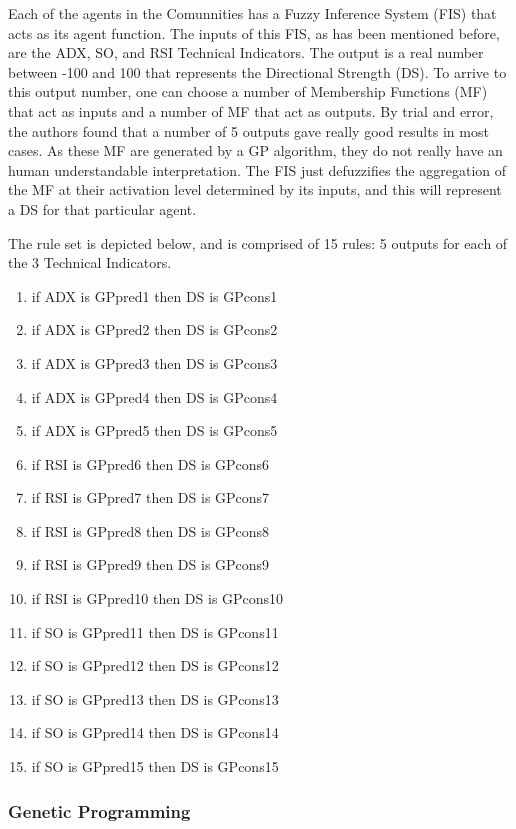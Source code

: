 Each of the agents in the Comunnities has a Fuzzy Inference System (FIS) that acts as its agent function. The inputs of this FIS, as has been mentioned before, are the ADX, SO, and RSI Technical Indicators. The output is a real number between -100 and 100 that represents the Directional Strength (DS). To arrive to this output number, one can choose a number of Membership Functions (MF) that act as inputs and a number of MF that act as outputs. By trial and error, the authors found that a number of 5 outputs gave really good results in most cases. As these MF are generated by a GP algorithm, they do not really have an human understandable interpretation. The FIS just defuzzifies the aggregation of the MF at their activation level determined by its inputs, and this will represent a DS for that particular agent.

The rule set is depicted below, and is comprised of 15 rules: 5 outputs for each of the 3 Technical Indicators.

\begin{enumerate}
\item if ADX is GPpred1 then DS is GPcons1
\item if ADX is GPpred2 then DS is GPcons2
\item if ADX is GPpred3 then DS is GPcons3
\item if ADX is GPpred4 then DS is GPcons4
\item if ADX is GPpred5 then DS is GPcons5

\item if RSI is GPpred6 then DS is GPcons6
\item if RSI is GPpred7 then DS is GPcons7
\item if RSI is GPpred8 then DS is GPcons8
\item if RSI is GPpred9 then DS is GPcons9
\item if RSI is GPpred10 then DS is GPcons10

\item if SO is GPpred11 then DS is GPcons11
\item if SO is GPpred12 then DS is GPcons12
\item if SO is GPpred13 then DS is GPcons13
\item if SO is GPpred14 then DS is GPcons14
\item if SO is GPpred15 then DS is GPcons15
\end{enumerate}

\subsubsection{Genetic Programming}

